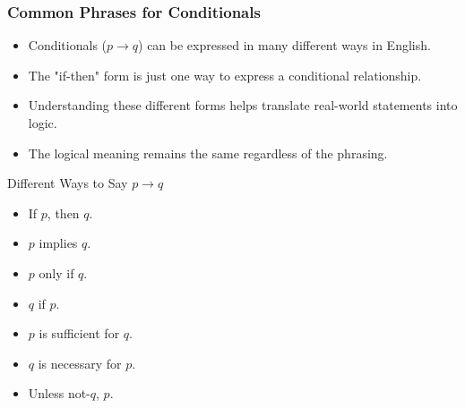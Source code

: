\documentclass{beamer}
\begin{document}
            \begin{frame}
            \frametitle{Common Phrases for Conditionals}
            \begin{itemize}
                \item Conditionals ($p \rightarrow q$) can be expressed in many different ways in English.
                \item The "if-then" form is just one way to express a conditional relationship.
                \item Understanding these different forms helps translate real-world statements into logic.
                \item The logical meaning remains the same regardless of the phrasing.
            \end{itemize}
            
            \begin{block}{Different Ways to Say $p \rightarrow q$}
                \scriptsize
            \begin{itemize}
                \item If $p$, then $q$.
                \item $p$ implies $q$.
                \item $p$ only if $q$.
                \item $q$ if $p$.
                \item $p$ is sufficient for $q$.
                \item $q$ is necessary for $p$.
                \item Unless not-$q$, $p$.
            \end{itemize}
            \end{block}
            \end{frame}
\end{document}

